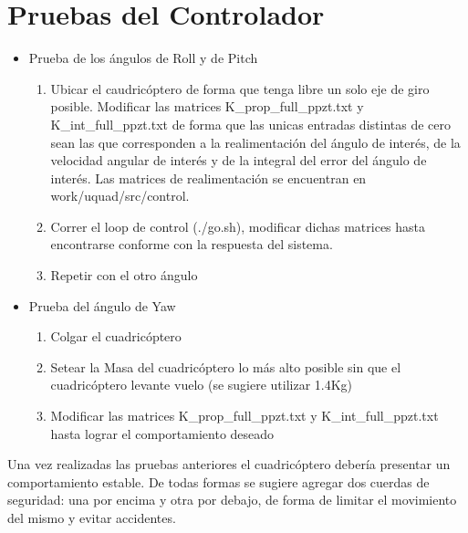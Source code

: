 \documentclass[main]{subfiles}
\begin{document}
\section{Pruebas del Controlador}
\begin{itemize}
\item Prueba de los \'angulos de Roll y de Pitch
	\begin{enumerate}
	\item Ubicar el caudric\'optero de forma que tenga libre un solo eje de giro posible. Modificar las matrices K\_prop\_full\_ppzt.txt y K\_int\_full\_ppzt.txt de forma que las unicas entradas distintas de cero sean las que corresponden a la realimentaci\'on del \'angulo de inter\'es, de la velocidad angular de inter\'es y de la integral del error del \'angulo de inter\'es. Las matrices de realimentaci\'on se encuentran en work/uquad/src/control.
	\item Correr el loop de control (./go.sh), modificar dichas matrices hasta encontrarse conforme con la respuesta del sistema.
	\item Repetir con el otro \'angulo
	\end{enumerate}
\item Prueba del \'angulo de Yaw
	\begin{enumerate}
	\item Colgar el cuadric\'optero
	\item Setear la Masa del cuadric\'optero lo m\'as alto posible sin que el cuadric\'optero levante vuelo (se sugiere utilizar 1.4Kg)
	\item Modificar las matrices K\_prop\_full\_ppzt.txt y K\_int\_full\_ppzt.txt hasta lograr el comportamiento deseado
	\end{enumerate}
\end{itemize}
Una vez realizadas las pruebas anteriores el cuadric\'optero deber\'ia presentar un comportamiento estable. De todas formas se sugiere agregar dos cuerdas de seguridad: una por encima y otra por debajo, de forma de limitar el movimiento del mismo y evitar accidentes. 
\end{document}
